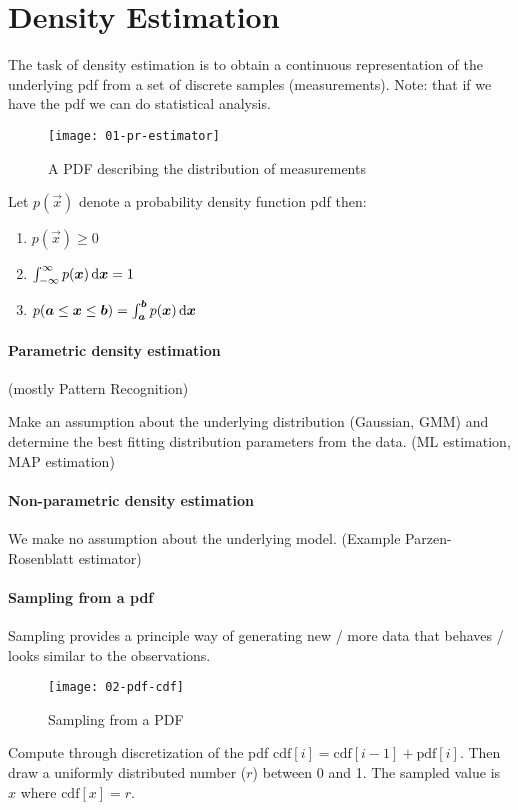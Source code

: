 
\section{Density Estimation}
The task of density estimation is to obtain a continuous representation of the underlying pdf from a set of discrete samples (measurements). Note: that if we have the pdf we can do statistical analysis.

\begin{figure}[H]
  \centering
  \texttt{[image: 01-pr-estimator]}
  \caption{A PDF describing the distribution of measurements}
\end{figure}

Let $p(\vec{x})$ denote a probability density function pdf then:

\begin{enumerate}
  \item $p(\vec{x}) \ge 0$
  \item $\int_{-\infty}^\infty p(\bm{x})\mathop{}\!\mathrm{d}\bm{x} = 1$
  \item $ p(\bm{a} \le \bm{x} \le \bm{b}) = \int_{\bm{a}}^{\bm{b}} p(\bm{x})\mathop{}\!\mathrm{d}\bm{x}$
\end{enumerate}

\paragraph{Parametric density estimation}
(mostly Pattern Recognition)

Make an assumption about the underlying distribution (\eg Gaussian, GMM) and determine the best fitting distribution parameters from the data. (ML estimation, MAP estimation)

\paragraph{Non-parametric density estimation}

We make no assumption about the underlying model. (Example Parzen-Rosenblatt estimator)

\paragraph{Sampling from a pdf}
Sampling provides a principle way of generating new / more data that behaves / looks similar to the observations.

\begin{figure}[H]
  \centering
  \texttt{[image: 02-pdf-cdf]}
  \caption{Sampling from a PDF}
\end{figure}

Compute through discretization of the pdf $\text{cdf}[i] = \text{cdf}[i-1] + \text{pdf}[i]$. Then draw a uniformly distributed number ($r$) between 0 and 1. The sampled value is $x$ where $\text{cdf}[x] = r$.
